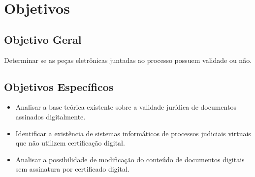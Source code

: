 \chapter{Objetivos}

\section{Objetivo Geral}

Determinar se as peças eletrônicas juntadas ao processo possuem validade ou não.  

\section{Objetivos Específicos}
\begin{itemize}
 \item Analisar a base teórica existente sobre a validade jurídica de documentos assinados digitalmente.
 \item Identificar a existência de sistemas informáticos de processos judiciais virtuais que não utilizem certificação digital.
 \item Analisar a possibilidade de modificação do conteúdo de documentos digitais sem assinatura por certificado digital.
\end{itemize}
